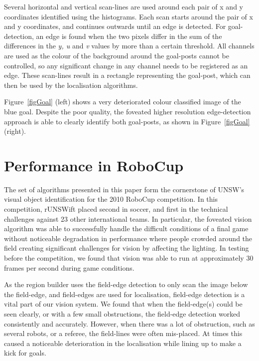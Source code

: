 \documentclass[runningheads,a4paper]{llncs}
\begin{document}
Several horizontal and vertical scan-lines are used around each pair of x and y coordinates identified using the histograms. Each scan starts around the pair of x and y coordinates, and continues outwards until an edge is detected. For goal-detection, an edge is found when the two pixels differ in the sum of the differences in the \emph{y, u} and \emph{v} values by more than a certain threshold. All channels are used as the colour of the background around the goal-posts cannot be controlled, so any significant change in any channel needs to be registered as an edge. These scan-lines result in a rectangle representing the goal-post, which can then be used by the localisation algorithms.

Figure~\ref{figGoal} (left) shows a very deteriorated colour classified image of
the blue goal. Despite the poor quality, the foveated higher resolution
edge-detection approach is able to clearly identify both goal-posts, as shown
in Figure~\ref{figGoal} (right).

\section{Performance in RoboCup}

The set of algorithms presented in this paper form the cornerstone of UNSW's
visual object identification for the 2010 RoboCup competition. In this
competition, rUNSWift placed second in soccer, and first in the technical
challenges against 23 other international teams. In particular, the foveated
vision algorithm was able to successfully handle the difficult conditions of a
final game  without noticeable degradation in performance where people crowded
around the field creating significant challenges for vision by affecting the
lighting. In testing before the competition, we found that vision was able to
run at approximately 30 frames per second during game conditions.

As the region builder uses the field-edge detection to only scan the image below
the field-edge, and field-edges are used for localisation, field-edge detection
is a vital part of our vision system. We found that when the field-edge(s) could
be seen clearly, or with a few small obstructions, the field-edge detection
worked consistently and accurately. However, when there was a lot of
obstruction, such as several robots, or a referee, the field-lines were often
mis-placed. At times this caused a noticeable deterioration in the localisation
while lining up to make a kick for goals.
\end{document}

